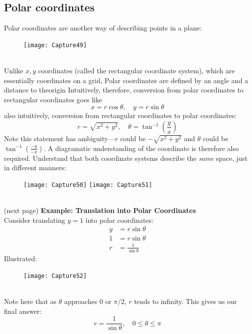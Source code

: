 \documentclass{report}
\begin{document}
\subsection{Polar coordinates} %
Polar coordinates are another way of describing points in a plane:
\begin{figure}[h]
\texttt{[image: Capture49]}\\
\centering
{}
\end{figure}\\
Unlike $x,y$ coordinates (called the rectangular coordinate system), which are essentially
coordinates on a grid,
Polar coordinates are defined by an angle and a distance to theorigin
Intuitively, therefore, conversion from polar coordinates to rectangular coordinates goes like
\begin{equation*}
x=r\cos\theta,\quad y=r\sin\theta
\end{equation*}
also intuitively, conversion from rectangular coordinates to polar coordinates:
\begin{equation*}
r=\sqrt{x^2+y^2},\quad\theta=\tan^{-1}\left(\frac{y}{x}\right)
\end{equation*}
Note this statement has ambiguity---$r$ could be $-\sqrt{x^2+y^2}$ and $\theta$ could be 
$\tan^{-1}\left(\frac{-y}{-x}\right)$. A diagramatic understanding of the coordinate is therefore also
required. Understand that 
both coordinate systems describe the \textit{same} space, just in different manners:
\begin{figure}[h]
\texttt{[image: Capture50]}
\texttt{[image: Capture51]}\\
\centering
{}
\end{figure}\\
(next page)
\newpage
\noindent\textbf{Example: Translation into Polar Coordinates}\\
Consider translating $y=1$ into polar coordinates:
\begin{align*}
y&=r\sin\theta\\
1&=r\sin\theta\\
r&=\frac{1}{\sin\theta}
\end{align*}
Illustrated:
\begin{figure}[h]
\texttt{[image: Capture52]}\\
\centering
{}
\end{figure}\\
Note here that as $\theta$ approaches 0 or $\pi/2$, $r$ tends to infinity. This gives us our
final answer:
\begin{equation*}
r=\frac{1}{\sin\theta},\quad0\leq\theta\leq\pi
\end{equation*}
\newpage
\end{document}

